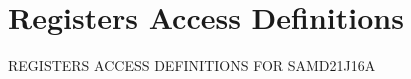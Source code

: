 \hypertarget{group___s_a_m_d21_j16_a__reg}{}\section{Registers Access Definitions}
\label{group___s_a_m_d21_j16_a__reg}
R\+E\+G\+I\+S\+T\+E\+RS A\+C\+C\+E\+SS D\+E\+F\+I\+N\+I\+T\+I\+O\+NS F\+OR S\+A\+M\+D21\+J16A 